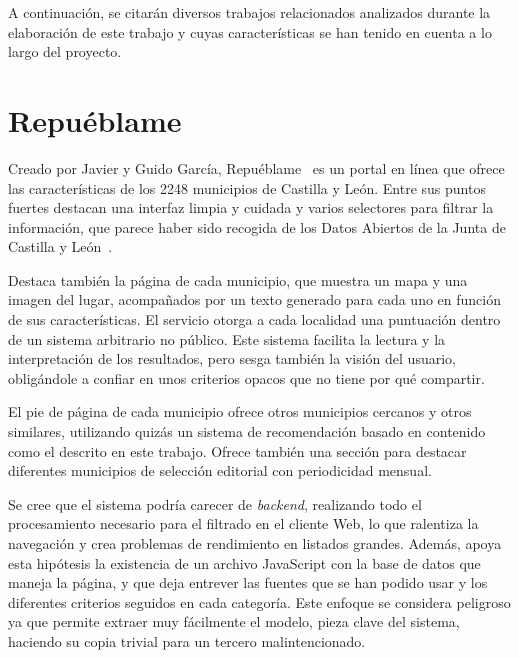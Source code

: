 
A continuación, se citarán diversos trabajos relacionados analizados durante la elaboración de este trabajo y cuyas características se han tenido en cuenta a lo largo del proyecto.

\section{Repuéblame}

Creado por Javier y Guido García, Repuéblame~\cite{repueblame} es un portal en línea que ofrece las características de los 2248 municipios de Castilla y León. Entre sus puntos fuertes destacan una interfaz limpia y cuidada y varios selectores para filtrar la información, que parece haber sido recogida de los Datos Abiertos de la Junta de Castilla y León~\cite{datos_abiertos_jcyl}.


Destaca también la página de cada municipio, que muestra un mapa y una imagen del lugar, acompañados por un texto generado para cada uno en función de sus características. El servicio otorga a cada localidad una puntuación dentro de un sistema arbitrario no público. Este sistema facilita la lectura y la interpretación de los resultados, pero sesga también la visión del usuario, obligándole a confiar en unos criterios opacos que no tiene por qué compartir.


El pie de página de cada municipio ofrece otros municipios cercanos y otros similares, utilizando quizás un sistema de recomendación basado en contenido como el descrito en este trabajo. Ofrece también una sección para destacar diferentes municipios de selección editorial con periodicidad mensual.


Se cree que el sistema podría carecer de \textit{backend}, realizando todo el procesamiento necesario para el filtrado en el cliente Web, lo que ralentiza la navegación y crea problemas de rendimiento en listados grandes. Además, apoya esta hipótesis la existencia de un archivo JavaScript con la base de datos que maneja la página, y que deja entrever las fuentes que se han podido usar y los diferentes criterios seguidos en cada categoría. Este enfoque se considera peligroso ya que permite extraer muy fácilmente el modelo, pieza clave del sistema, haciendo su copia trivial para un tercero malintencionado.

